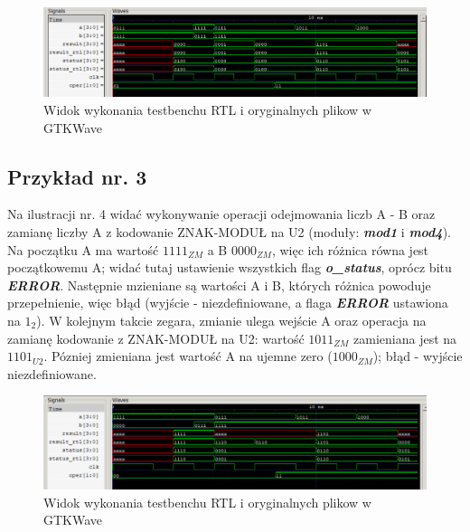 \begin{figure}[h!]
	\centering
	\includegraphics[width=1\linewidth]{img2}
	\caption{Widok wykonania testbenchu RTL i oryginalnych plikow w GTKWave}
	\label{fig:img1}
\end{figure}

\newpage

\subsection{Przykład nr. 3}

Na ilustracji nr. 4 widać wykonywanie operacji odejmowania liczb A - B oraz zamianę liczby A z kodowanie ZNAK-MODUŁ na U2 (moduły: \textbf{\emph{mod1}} i \textbf{\emph{mod4}}). Na początku A ma wartość \(1111_{ZM}\) a B \(0000_{ZM}\), więc ich różnica równa jest początkowemu A; widać tutaj ustawienie wszystkich flag \textbf{\emph{o\_status}}, oprócz bitu \textbf{\emph{ERROR}}. Następnie mzieniane są wartości A i B, których różnica powoduje przepełnienie, więc błąd (wyjście - niezdefiniowane, a flaga \textbf{\emph{ERROR}} ustawiona na \(1_2\)). W kolejnym takcie zegara, zmianie ulega wejście A oraz operacja na zamianę kodowanie z ZNAK-MODUŁ na U2: wartość \(1011_{ZM}\) zamieniana jest na \(1101_{U2}\). Pózniej zmieniana jest wartość A na ujemne zero (\(1000_{ZM}\)); błąd - wyjście niezdefiniowane.

\begin{figure}[h!]
	\centering
	\includegraphics[width=1\linewidth]{img3}
	\caption{Widok wykonania testbenchu RTL i oryginalnych plikow w GTKWave}
	\label{fig:img1}
\end{figure}

